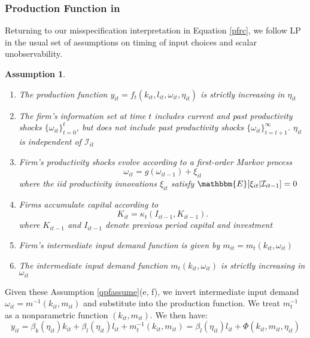 \documentclass[11pt]{article}
\newtheorem{assump}{Assumption}[section]
\begin{document}
\subsubsection{Production Function in \cite{Levinsohn2003}}
Returning to our misspecification interpretation in Equation \eqref{pfrc}, we follow LP in the usual set of assumptions on timing of input choices and scalar unobservability.

\begin{assump} \label{qpfassume}
~
\begin{enumerate}[label=(\alph*)]
	\item The production function $y_{it}=f_{t}(k_{it}, l_{it}, \omega_{it}, \eta_{it})$ is strictly increasing in $\eta_{it}$
	\item The firm's information set at time $t$ includes current and past productivity shocks $\{\omega_{it}\}_{t=0}^{t}$, but does not include past productivity shocks $\{\omega_{it}\}_{t=t+1}^{\infty}$. $\eta_{it}$ is independent of $\mathcal{I}_{it}$
	\item Firm's productivity shocks evolve according to a first-order Markov process
	\begin{equation}
	\omega_{it}=g(\omega_{it-1})+\xi_{it}
	\end{equation}
	where the iid productivity innovations $\xi_{it}$ satisfy $\mathbbm{E}[\xi_{it}|\mathcal{I}_{it-1}]=0$
	\item Firms accumulate capital according to
	\begin{equation}
	    K_{it}=\kappa_{t}(I_{it-1}, K_{it-1}).
	\end{equation}
	where $K_{it-1}$ and $I_{it-1}$ denote previous period capital and investment
	\item Firm's intermediate input demand function is given by $m_{it}=m_{t}(k_{it}, \omega_{it})$
	\item The intermediate input demand function $m_{t}(k_{it}, \omega_{it})$ is strictly increasing in $\omega_{it}$
\end{enumerate}
\end{assump}

Given these Assumption \eqref{qpfassume}(e, f), we invert intermediate input demand $\omega_{it}=m^{-1}(k_{it}, m_{it})$ and substitute into the production function. We treat $m_{t}^{-1}$ as a nonparametric function $(k_{it}, m_{it})$. We then have:
\begin{equation} \label{qpf1st}
y_{it}=\beta_{k}(\eta_{it})k_{it}+\beta_{l}(\eta_{it})l_{it}+m_{t}^{-1}(k_{it}, m_{it})=\beta_{l}(\eta_{it})l_{it}+\Phi(k_{it}, m_{it}, \eta_{it})
\end{equation}
\end{document}
